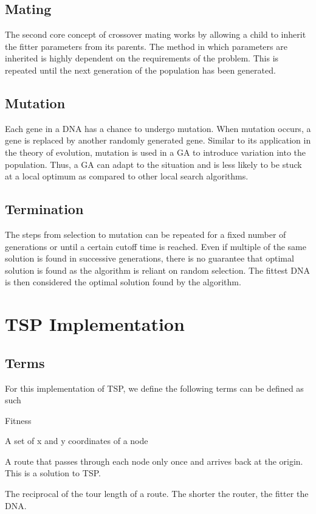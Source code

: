 \documentclass[sigconf]{acmart}
\begin{document}
\subsection{Mating}
The second core concept of crossover mating works by allowing a child to inherit the fitter parameters from its parents. The method in which parameters are inherited is highly dependent on the requirements of the problem. This is repeated until the next generation of the population has been generated. 

\subsection{Mutation}
Each gene in a DNA has a chance to undergo mutation. When mutation occurs, a gene is replaced by another randomly generated gene. Similar to its application in the theory of evolution, mutation is used in a GA to introduce variation into the population. Thus, a GA can adapt to the situation and is less likely to be stuck at a local optimum as compared to other local search algorithms.

\subsection{Termination}
The steps from selection to mutation can be repeated for a fixed number of generations or until a certain cutoff time is reached. Even if multiple of the same solution is found in successive generations, there is no guarantee that optimal solution is found as the algorithm is reliant on random selection. The fittest DNA is then considered the optimal solution found by the algorithm.

\section{TSP Implementation}
\subsection{Terms}
For this implementation of TSP, we define the following terms can be defined as such
\begin{labeling}{Fitness\quad}
  \item[Gene] A set of x and y coordinates of a node 
  \item[DNA] A route that passes through each node only once and arrives back at the origin. This is a solution to TSP.
  \item[Fitness] The reciprocal of the tour length of a route. The shorter the router, the fitter the DNA.
\end{labeling}
\end{document}
